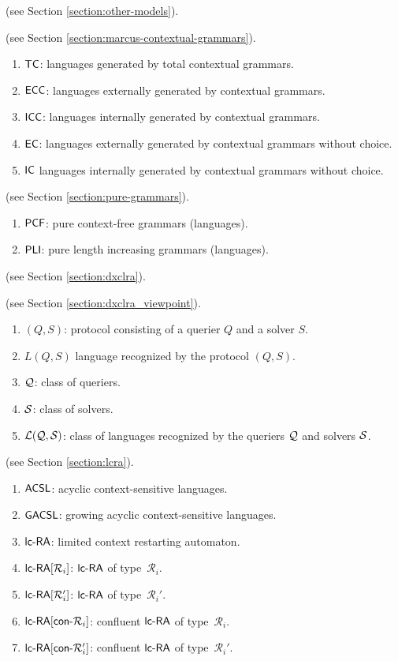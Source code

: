  (see Section \ref{section:other-models}).

 (see Section \ref{section:marcus-contextual-grammars}).

\begin{enumerate}[]
\item $\textup{\sf TC}$: languages generated by total contextual grammars.
\item $\textup{\sf ECC}$: languages externally generated by contextual grammars.
\item $\textup{\sf ICC}$: languages internally generated by contextual grammars.
\item $\textup{\sf EC}$: languages externally generated by contextual grammars without choice.
\item $\textup{\sf IC}$ languages internally generated by contextual grammars without choice.
\end{enumerate}

 (see Section \ref{section:pure-grammars}).

\begin{enumerate}[]
\item $\textup{\sf PCF}$: pure context-free grammars (languages).
\item $\textup{\sf PLI}$: pure length increasing grammars (languages).
\end{enumerate}

 (see Section \ref{section:dxclra}).

 (see Section \ref{section:dxclra_viewpoint}).

\begin{enumerate}[]
\item $(Q, S)$: protocol consisting of a querier $Q$ and a solver $S$.
\item $L(Q, S)$ language recognized by the protocol $(Q, S)$.
\item $\mathcal{Q}$: class of queriers.
\item $\mathcal{S}$: class of solvers.
\item ${\cal L}(\mathcal{Q}, \mathcal{S})$: class of languages recognized by the queriers $\mathcal{Q}$ and solvers $\mathcal{S}$.
\end{enumerate}

 (see Section \ref{section:lcra}).

\begin{enumerate}[]
\item $\textup{\sf ACSL}$: acyclic context-sensitive languages.
\item $\textup{\sf GACSL}$: growing acyclic context-sensitive languages.
\item $\lcRA$: limited context restarting automaton.
\item $\lcRA[i]$: $\lcRA$ of type~$\mathcal{R}_i$.
\item $\lcRAp[i]$: $\lcRA$ of type~$\mathcal{R}_i'$.
\item $\textup{\sf lc-RA$[\textup{\sf con-}\mathcal{R}_i]$}$: confluent $\lcRA$ of type~$\mathcal{R}_i$.
\item $\textup{\sf lc-RA$[\textup{\sf con-}\mathcal{R}_i']$}$: confluent $\lcRA$ of type~$\mathcal{R}_i'$.
\end{enumerate}
